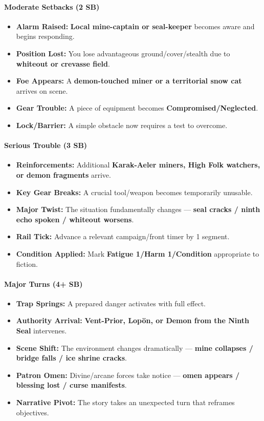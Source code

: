 \paragraph{Moderate Setbacks (2 SB)}
\begin{itemize}
\item \textbf{Alarm Raised:} \textbf{Local mine-captain or seal-keeper} becomes aware and begins responding.
\item \textbf{Position Lost:} You lose advantageous ground/cover/stealth due to \textbf{whiteout or crevasse field}.
\item \textbf{Foe Appears:} A \textbf{demon-touched miner or a territorial snow cat} arrives on scene.
\item \textbf{Gear Trouble:} A piece of equipment becomes \textbf{Compromised/Neglected}.
\item \textbf{Lock/Barrier:} A simple obstacle now requires a test to overcome.
\end{itemize}

\paragraph{Serious Trouble (3 SB)}
\begin{itemize}
\item \textbf{Reinforcements:} Additional \textbf{Karak-Aeler miners, High Folk watchers, or demon fragments} arrive.
\item \textbf{Key Gear Breaks:} A crucial tool/weapon becomes temporarily unusable.
\item \textbf{Major Twist:} The situation fundamentally changes --- \textbf{seal cracks / ninth echo spoken / whiteout worsens}.
\item \textbf{Rail Tick:} Advance a relevant campaign/front timer by 1 segment.
\item \textbf{Condition Applied:} Mark \textbf{Fatigue 1/Harm 1/Condition} appropriate to fiction.
\end{itemize}

\paragraph{Major Turns (4+ SB)}
\begin{itemize}
\item \textbf{Trap Springs:} A prepared danger activates with full effect.
\item \textbf{Authority Arrival:} \textbf{Vent-Prior, Lopön, or Demon from the Ninth Seal} intervenes.
\item \textbf{Scene Shift:} The environment changes dramatically --- \textbf{mine collapses / bridge falls / ice shrine cracks}.
\item \textbf{Patron Omen:} Divine/arcane forces take notice --- \textbf{omen appears / blessing lost / curse manifests}.
\item \textbf{Narrative Pivot:} The story takes an unexpected turn that reframes objectives.
\end{itemize}

